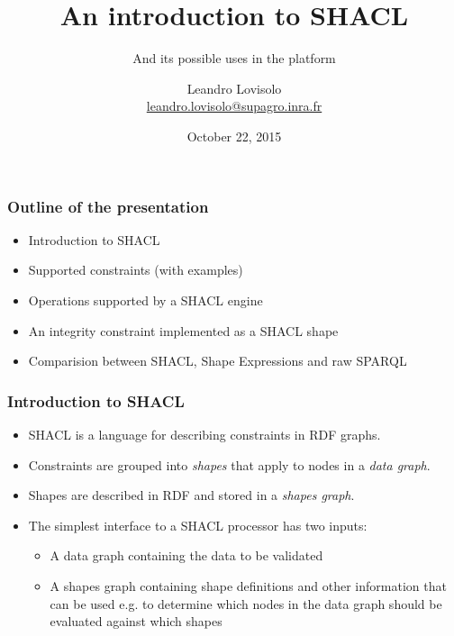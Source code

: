 \documentclass{beamer}
\title{An introduction to SHACL}
\subtitle{And its possible uses in the \atweb platform}
\author{
  Leandro Lovisolo \\
  \footnotesize{\href{mailto:leandro.lovisolo@supagro.inra.fr}
                     {leandro.lovisolo@supagro.inra.fr}}
}
\date{October 22, 2015}
\institute{
  INRA SupAgro and INRIA GraphiK \\
  Montpellier, France
}
\begin{document}
\begin{frame}
  \titlepage
\end{frame}

\begin{frame}
  \frametitle{Outline of the presentation}

  \begin{itemize}
    \item Introduction to SHACL
    \item Supported constraints (with examples)
    \item Operations supported by a SHACL engine
    \item An integrity constraint implemented as a SHACL shape
    \item Comparision between SHACL, Shape Expressions and raw SPARQL
  \end{itemize}
\end{frame}

\begin{frame}
  \frametitle{Introduction to SHACL}

  \pause

  \begin{itemize}
    \item SHACL is a language for describing constraints in RDF graphs.

    \pause

    \item Constraints are grouped into \textit{shapes} that apply to nodes in a
      \textit{data graph}.

    \pause

    \item Shapes are described in RDF and stored in a \textit{shapes graph}.

    \pause

    \item The simplest interface to a SHACL processor has two inputs:

    \pause

    \begin{itemize}
      \item A data graph containing the data to be validated

      \pause

      \item A shapes graph containing shape definitions and other information
        that can be used e.g. to determine which nodes in the data graph should
        be evaluated against which shapes
    \end{itemize}
  \end{itemize}
\end{frame}
\end{document}
